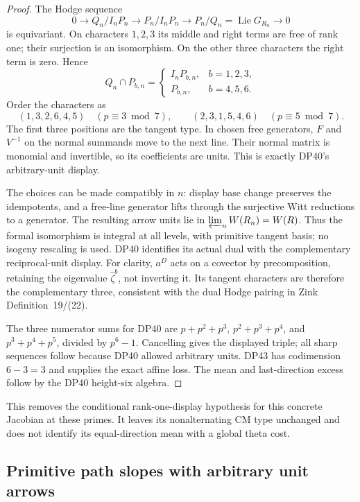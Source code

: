 \documentclass[11pt,a4paper]{article}
\theoremstyle{definition}\newtheorem{remark}[theorem]{Remark}
\newcommand{\Lie}{\operatorname{Lie}}\newcommand{\Dist}{\operatorname{Dist}}
\begin{document}
\begin{proof}
The Hodge sequence
\[
 0\longrightarrow Q_n/I_nP_n\longrightarrow P_n/I_nP_n
       \longrightarrow P_n/Q_n=\Lie G_{R_n}\longrightarrow0
\]
is equivariant. On characters $1,2,3$ its middle and right terms are free of rank one; their surjection is an isomorphism. On the other three characters the right term is zero. Hence
\[
 Q_n\cap P_{b,n}=
 \begin{cases}I_nP_{b,n},&b=1,2,3,\\P_{b,n},&b=4,5,6.\end{cases}
\]
Order the characters as
\[
 (1,3,2,6,4,5)\quad(p\equiv3\bmod7),\qquad
 (2,3,1,5,4,6)\quad(p\equiv5\bmod7).
\]
The first three positions are the tangent type. In chosen free generators, $F$ and $V^{-1}$ on the normal summands move to the next line. Their normal matrix is monomial and invertible, so its coefficients are units. This is exactly DP40's arbitrary-unit display.

The choices can be made compatibly in $n$: display base change preserves the idempotents, and a free-line generator lifts through the surjective Witt reductions to a generator. The resulting arrow units lie in
$\varprojlim_n W(R_n)=W(R)$.
Thus the formal isomorphism is integral at all levels, with primitive tangent basis; no isogeny rescaling is used.
DP40 identifies its actual dual with the complementary reciprocal-unit display. For clarity, $a^D$ acts on a covector by precomposition, retaining the eigenvalue $\widehat\zeta^b$, not inverting it. Its tangent characters are therefore the complementary three, consistent with the dual Hodge pairing in Zink Definition~19/(22).

The three numerator sums for DP40 are
$p+p^2+p^3$, $p^2+p^3+p^4$, and $p^3+p^4+p^5$, divided by $p^6-1$.
Cancelling gives the displayed triple; all sharp sequences follow because DP40 allowed arbitrary units. DP43 has codimension $6-3=3$ and supplies the exact affine loss. The mean and last-direction excess follow by the DP40 height-six algebra.
\end{proof}

This removes the conditional rank-one-display hypothesis for this concrete Jacobian at these primes. It leaves its nonalternating CM type unchanged and does not identify its equal-direction mean with a global theta cost.


\subsection{Primitive path slopes with arbitrary unit arrows}
\end{document}
